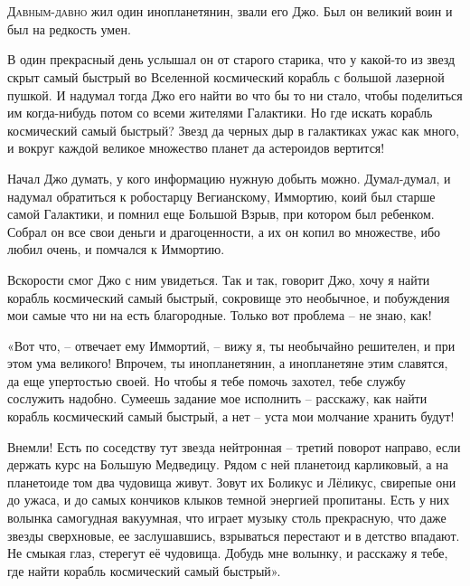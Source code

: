 \documentclass[ebook,oneside,final,openright]{memoir}
\begin{document}
\chapter{}
 \lettrine{Д}{авным-давно} жил один инопланетянин, звали его Джо. Был он великий воин и был на редкость умен.\par
\par
В один прекрасный день услышал он от старого старика, что у какой-то из звезд скрыт самый быстрый во Вселенной космический корабль с большой лазерной пушкой. И надумал тогда Джо его найти во что бы то ни стало, чтобы поделиться им когда-нибудь потом со всеми жителями Галактики. Но где искать корабль космический самый быстрый? Звезд да черных дыр в галактиках ужас как много, и вокруг каждой великое множество планет да астероидов вертится!\par
\par
Начал Джо думать, у кого информацию нужную добыть можно. Думал-думал, и надумал обратиться к робостарцу Вегианскому, Иммортию, коий был старше самой Галактики, и помнил еще Большой Взрыв, при котором был ребенком. Собрал он все свои деньги и драгоценности, а их он копил во множестве, ибо любил очень, и помчался к Иммортию.\par
\par
Вскорости смог Джо с ним увидеться. Так и так, говорит Джо, хочу я найти корабль космический самый быстрый, сокровище это необычное, и побуждения мои самые что ни на есть благородные. Только вот проблема – не знаю, как!\par
\par
«Вот что, – отвечает ему Иммортий, – вижу я, ты необычайно решителен, и при этом ума великого! Впрочем, ты инопланетянин, а инопланетяне этим славятся, да еще упертостью своей. Но чтобы я тебе помочь захотел, тебе службу сослужить надобно. Сумеешь задание мое исполнить – расскажу, как найти корабль космический самый быстрый, а нет – уста мои молчание хранить будут!\par
\par
Внемли! Есть по соседству тут звезда нейтронная – третий поворот направо, если держать курс на Большую Медведицу. Рядом с ней планетоид карликовый, а на планетоиде том два чудовища живут. Зовут их Боликус и Лёликус, свирепые они до ужаса, и до самых кончиков клыков темной энергией пропитаны. Есть у них волынка самогудная вакуумная, что играет музыку столь прекрасную, что даже звезды сверхновые, ее заслушавшись, взрываться перестают и в детство впадают. Не смыкая глаз, стерегут её чудовища. Добудь мне волынку, и расскажу я тебе, где найти корабль космический самый быстрый».\par
\end{document}
